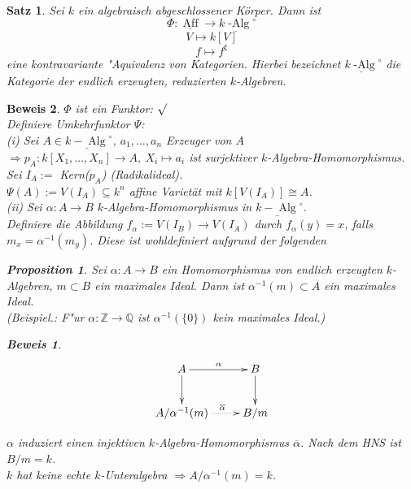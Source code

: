 \documentclass[a4paper,12pt]{report}
\theoremstyle{break}
\newtheorem{Satz}{Satz}
\newtheorem{Prop}[Def]{Proposition}
\theoremstyle{nonumberbreak}
\theoremstyle{nonumberplain}
\newtheorem{Bew}{Beweis}
\begin{document}
\begin{Satz}
\label{satz:4}
Sei $k$ ein algebraisch abgeschlossener Körper. Dann ist 
$$\Phi:\underline{\operatorname{Aff}} \longrightarrow \underline{k\operatorname{-Alg}}^{\circ}$$
$$V \longmapsto k[V]$$
$$f\longmapsto f^{\sharp}$$
eine kontravariante "Aquivalenz von Kategorien.
Hierbei bezeichnet $\underline{k\operatorname{-Alg}}^{\circ}$ die Kategorie der endlich erzeugten, reduzierten $k$-Algebren.
\end{Satz}
\begin{Bew}
$\Phi$ ist ein Funktor: $\surd$\\
Definiere Umkehrfunktor $\Psi$:~\\
(i) Sei $A\in \underline{k-\operatorname{Alg}}^{\circ}$, $a_1,\dots,a_n$ Erzeuger von $A$\\
$\Rightarrow p_A: k[X_1,\dots,X_n] \rightarrow A, \ X_i \mapsto a_i$ ist surjektiver $k$-Algebra-Homomorphismus.\\
Sei $I_A:=$ Kern($p_A$) (Radikalideal).\\
$\Psi(A):= V(I_A)\subseteq k^n$ affine Varietät mit $k[V(I_A)]\cong A$.\\
(ii) Sei $\alpha: A\rightarrow B$ $k$-Algebra-Homomorphismus in $\underline{k-\operatorname{Alg}}^{\circ}$.\\
Definiere die Abbildung $f_{\alpha} := V(I_B) \rightarrow V(I_A)$ durch $f_{\alpha}(y)=x$, falls $m_x=\alpha^{-1}(m_y)$. Diese ist wohldefiniert aufgrund der folgenden 
\begin{Prop}
Sei $\alpha : A\rightarrow B$ ein Homomorphismus von endlich erzeugten $k$-Algebren, $m\subset B$ ein maximales Ideal. Dann ist $\alpha^{-1}(m)\subset A$ ein maximales Ideal.\\
(Beispiel.: F"ur $\alpha:\mathbb{Z}\rightarrow \mathbb{Q}$ ist $\alpha^{-1}(\{0\})$ kein maximales Ideal.) 
\end{Prop}
\begin{Bew}
\[
\begin{xy}
\xymatrix{
A\ar[r]^{\alpha}\ar[d]&B\ar[d] \\
A/\alpha^{-1}(m)\ar@{.>}[r]^{\ \ \overline{\alpha}}&B/m
}
\end{xy}
\]

$\alpha$ induziert einen injektiven $k$-Algebra-Homomorphismus $\overline{\alpha}$. Nach dem HNS ist $B/m=k$.\\
$k$ hat keine echte $k$-Unteralgebra $\Rightarrow A/\alpha^{-1}(m)=k$.\\
\end{Bew}


\end{Bew}
\end{document}
